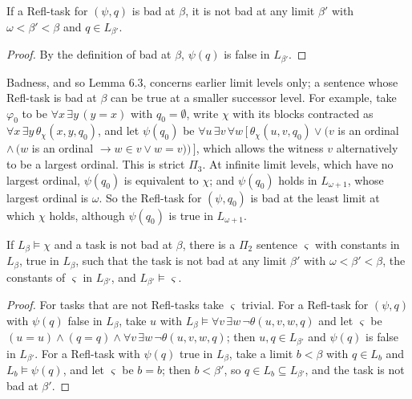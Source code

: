 \documentclass[11pt]{article}
\begin{document}
\begin{statement} If a Refl-task for $(\psi, q)$ is bad at $\beta$, it is not bad at any limit
$\beta'$ with $\omega < \beta' < \beta$ and $q \in L_{\beta'}$.
\end{statement}

\begin{proof}
By the definition of bad at $\beta$, $\psi(q)$ is false in $L_{\beta'}$.
\end{proof}

Badness, and so Lemma 6.3, concerns earlier limit levels only; a sentence whose Refl-task is bad at $\beta$ can be
true at a smaller successor level. For example, take $\varphi_0$ to be $\forall x\, \exists y\, (y = x)$ with $q_0 =
\emptyset$, write $\chi$ with its blocks contracted as $\forall x\, \exists y\, \theta_\chi(x, y, q_0)$, and let
$\psi(q_0)$ be $\forall u\, \exists v\, \forall w\, [\, \theta_\chi(u, v, q_0) \vee (v$ is an ordinal $\wedge\, (w$ is
an ordinal $\to w \in v \vee w = v))\, ]$, which allows the witness $v$ alternatively to be a largest ordinal. This is
strict $\Pi_3$. At infinite limit levels, which have no largest ordinal, $\psi(q_0)$ is equivalent to $\chi$; and
$\psi(q_0)$ holds in $L_{\omega+1}$, whose largest ordinal is $\omega$. So the Refl-task for $(\psi, q_0)$ is bad at
the least limit at which $\chi$ holds, although $\psi(q_0)$ is true in $L_{\omega+1}$.

\begin{statement} If $L_{\beta} \models \chi$ and a task is not bad at $\beta$, there is a $\Pi_2$
sentence $\varsigma$ with constants in $L_{\beta}$, true in $L_{\beta}$, such that the task is not bad at any limit
$\beta'$ with $\omega < \beta' < \beta$, the constants of $\varsigma$ in $L_{\beta'}$, and $L_{\beta'} \models \varsigma$.
\end{statement}

\begin{proof}
For tasks that are not Refl-tasks take $\varsigma$ trivial. For a Refl-task for $(\psi, q)$ with $\psi(q)$ false in
$L_{\beta}$, take $u$ with $L_{\beta} \models \forall v\, \exists w\, \neg\theta(u, v, w, q)$ and let $\varsigma$ be
$(u = u) \wedge (q = q) \wedge \forall v\, \exists w\, \neg\theta(u, v, w, q)$; then $u, q \in L_{\beta'}$ and
$\psi(q)$ is false in $L_{\beta'}$. For a Refl-task with $\psi(q)$ true in $L_{\beta}$, take a limit
$b < \beta$ with $q \in L_b$ and $L_b \models \psi(q)$, and let $\varsigma$ be $b = b$; then $b < \beta'$, so
$q \in L_b \subseteq L_{\beta'}$, and the task is not bad at $\beta'$.
\end{proof}
\end{document}
